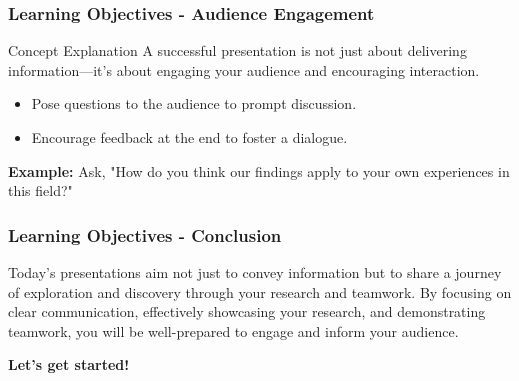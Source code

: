 \documentclass{beamer}
\begin{document}
\begin{frame}[fragile]
    \frametitle{Learning Objectives - Audience Engagement}
    \begin{block}{Concept Explanation}
        A successful presentation is not just about delivering information—it's about engaging your audience and encouraging interaction.
    \end{block}
    \begin{itemize}
        \item Pose questions to the audience to prompt discussion.
        \item Encourage feedback at the end to foster a dialogue.
    \end{itemize}
    \textbf{Example:} Ask, "How do you think our findings apply to your own experiences in this field?"
\end{frame}

\begin{frame}[fragile]
    \frametitle{Learning Objectives - Conclusion}
    Today's presentations aim not just to convey information but to share a journey of exploration and discovery through your research and teamwork. By focusing on clear communication, effectively showcasing your research, and demonstrating teamwork, you will be well-prepared to engage and inform your audience.
    
    \textbf{Let's get started!}
\end{frame}
\end{document}
